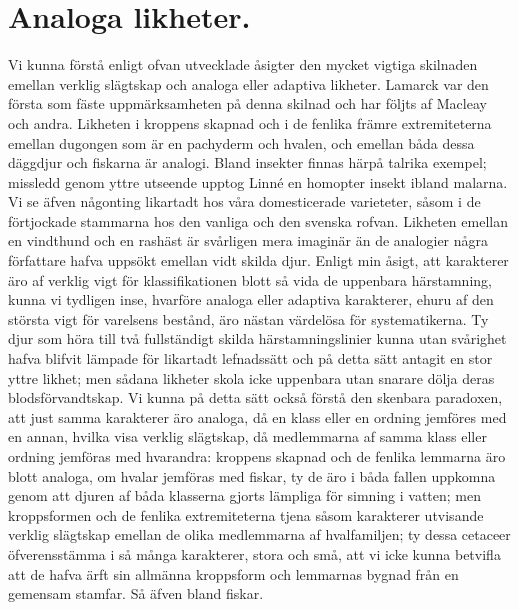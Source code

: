 \section{Analoga likheter.}

Vi kunna förstå enligt ofvan utvecklade åsigter den mycket vigtiga skilnaden emellan verklig slägtskap och analoga eller adaptiva likheter. Lamarck var den första som fäste uppmärksamheten på denna skilnad och har följts af Macleay och andra. Likheten i kroppens skapnad och i de fenlika främre extremiteterna emellan dugongen som är en pachyderm och hvalen, och emellan båda dessa däggdjur och fiskarna är analogi. Bland insekter finnas härpå talrika exempel; missledd genom yttre utseende upptog Linné en homopter insekt ibland malarna. Vi se äfven någonting likartadt hos våra domesticerade varieteter, såsom i de förtjockade stammarna hos den vanliga och den svenska rofvan. Likheten emellan en vindthund och en rashäst är svårligen mera imaginär än de analogier några författare hafva uppsökt emellan vidt skilda djur. Enligt min åsigt, att karakterer äro af verklig vigt för klassifikationen blott så vida de uppenbara härstamning, kunna vi tydligen inse, hvarföre analoga eller adaptiva karakterer, ehuru af den största vigt för varelsens bestånd, äro nästan värdelösa för systematikerna. Ty djur som höra till två fullständigt skilda härstamningslinier kunna utan svårighet hafva blifvit lämpade för likartadt lefnadssätt och på detta sätt antagit en stor yttre likhet; men sådana likheter skola icke uppenbara utan snarare dölja deras blodsförvandtskap. Vi kunna på detta sätt också förstå den skenbara paradoxen, att just samma karakterer äro analoga, då en klass eller en ordning jemföres med en annan, hvilka visa verklig slägtskap, då medlemmarna af samma klass eller ordning jemföras med hvarandra: kroppens skapnad och de fenlika lemmarna äro blott analoga, om hvalar jemföras med fiskar, ty de äro i båda fallen uppkomna genom att djuren af båda klasserna gjorts lämpliga för simning i vatten; men kroppsformen och de fenlika extremiteterna tjena såsom karakterer utvisande verklig slägtskap emellan de olika medlemmarna af hvalfamiljen; ty dessa cetaceer öfverensstämma i så många karakterer, stora och små, att vi icke kunna betvifla att de hafva ärft sin allmänna kroppsform och lemmarnas bygnad från en gemensam stamfar. Så äfven bland fiskar.

